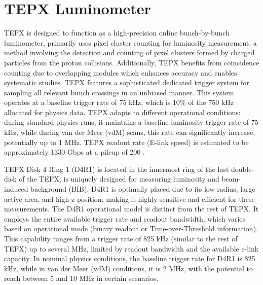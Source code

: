 \newpage
\section{TEPX Luminometer}

TEPX is designed to function as a high-precision online bunch-by-bunch luminometer, primarily uses pixel cluster counting for luminosity measurement, a method involving the detection and counting of pixel clusters formed by charged particles from the proton collisions. Additionally, TEPX benefits from coincidence counting due to overlapping modules which enhances accuracy and enables systematic studies. %
TEPX features a sophisticated dedicated trigger system for sampling all relevant bunch crossings in an unbiased manner. This system operates at a baseline trigger rate of 75 kHz, which is 10$\%$  of the 750 kHz allocated for physics data. %
TEPX adapts to different operational conditions: during standard physics runs, it maintains a baseline luminosity trigger rate of 75 kHz, while during van der Meer (vdM) scans, this rate can significantly increase, potentially up to 1 MHz. TEPX readout rate (E-link speed) is estimated to be approximately 1330 Gbps at a pileup of 200  \cite{Collaboration:2706512}.

TEPX Disk 4 Ring 1 (D4R1) is located in the innermost ring of the last double-disk of the TEPX, is uniquely designed for measuring luminosity and beam-induced background (BIB). D4R1 is optimally placed due to its low radius, large active area, and high z position, making it highly sensitive and efficient for these measurements. The D4R1 operational model is distinct from the rest of TEPX. It employs the entire available trigger rate and readout bandwidth, which varies based on operational mode (binary readout or Time-over-Threshold information). This capability ranges from a trigger rate of 825 kHz (similar to the rest of TEPX) up to several MHz, limited by readout bandwidth and the available e-link capacity. In nominal physics conditions, the baseline trigger rate for D4R1 is 825 kHz, while in van der Meer (vdM) conditions, it is 2 MHz, with the potential to reach between 5 and 10 MHz in certain scenarios. 

